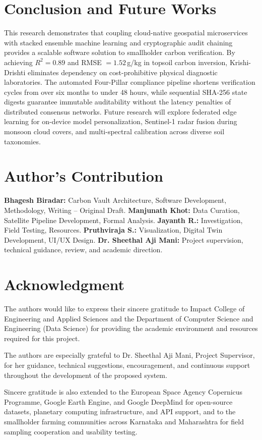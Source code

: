 \documentclass[10pt,a4paper,twocolumn]{IEEEtran}
\begin{document}
\section{Conclusion and Future Works}
This research demonstrates that coupling cloud-native geospatial microservices with stacked ensemble machine learning and cryptographic audit chaining provides a scalable software solution to smallholder carbon verification. By achieving $R^2 = 0.89$ and RMSE $= 1.52\,$g/kg in topsoil carbon inversion, Krishi-Drishti eliminates dependency on cost-prohibitive physical diagnostic laboratories. The automated Four-Pillar compliance pipeline shortens verification cycles from over six months to under 48 hours, while sequential SHA-256 state digests guarantee immutable auditability without the latency penalties of distributed consensus networks. Future research will explore federated edge learning for on-device model personalization, Sentinel-1 radar fusion during monsoon cloud covers, and multi-spectral calibration across diverse soil taxonomies.

\section*{Author's Contribution}
\noindent \textbf{Bhagesh Biradar:} Carbon Vault Architecture, Software Development, Methodology, Writing -- Original Draft. \textbf{Manjunath Khot:} Data Curation, Satellite Pipeline Development, Formal Analysis. \textbf{Jayanth R.:} Investigation, Field Testing, Resources. \textbf{Pruthviraja S.:} Visualization, Digital Twin Development, UI/UX Design. \textbf{Dr. Sheethal Aji Mani:} Project supervision, technical guidance, review, and academic direction.

\section*{Acknowledgment}
\noindent The authors would like to express their sincere gratitude to Impact College of Engineering and Applied Sciences and the Department of Computer Science and Engineering (Data Science) for providing the academic environment and resources required for this project.

\noindent The authors are especially grateful to Dr. Sheethal Aji Mani, Project Supervisor, for her guidance, technical suggestions, encouragement, and continuous support throughout the development of the proposed system.

\noindent Sincere gratitude is also extended to the European Space Agency Copernicus Programme, Google Earth Engine, and Google DeepMind for open-source datasets, planetary computing infrastructure, and API support, and to the smallholder farming communities across Karnataka and Maharashtra for field sampling cooperation and usability testing.
\end{document}
